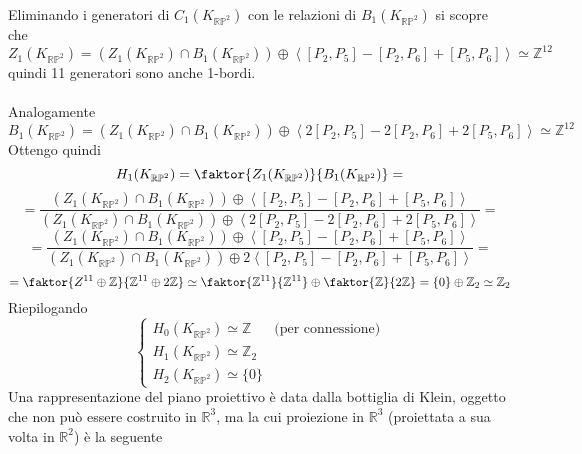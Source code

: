 \documentclass[a4paper]{report}
\newcommand{\Z}{\ensuremath{\mathbb{Z}}}
\newcommand{\R}{\ensuremath{\mathbb{R}}}
\newcommand{\KRP}[1]{\ensuremath{K_{\mathbb{RP}^{#1}}}}
\newcommand{\gen}[1]{\ensuremath{\left<{#1}\right>}}
\begin{document}
\begin{center}

\end{center}
Eliminando i generatori di $C_1(\KRP{2})$ con le relazioni di $B_1(\KRP{2})$ si scopre che
\[
    Z_1(\KRP{2})=\left(Z_1(\KRP{2})\cap B_1(\KRP{2})\right)\oplus\gen{[P_2,P_5]-[P_2,P_6]+[P_5,P_6]}\simeq\Z^{12}
\]
quindi 11 generatori sono anche 1-bordi.\\\\
Analogamente
\[
    B_1(\KRP{2})=\left(Z_1(\KRP{2})\cap B_1(\KRP{2})\right)\oplus\gen{2[P_2,P_5]-2[P_2,P_6]+2[P_5,P_6]}\simeq\Z^{12}
\]
Ottengo quindi
\[
    H_1(\KRP{2})=\faktor{Z_1(\KRP{2})}{B_1(\KRP{2})}=
\]
\[
    =\frac{\left(Z_1(\KRP{2})\cap B_1(\KRP{2})\right)\oplus\gen{[P_2,P_5]-[P_2,P_6]+[P_5,P_6]}}{\left(Z_1(\KRP{2})\cap B_1(\KRP{2})\right)\oplus\gen{2[P_2,P_5]-2[P_2,P_6]+2[P_5,P_6]}}=
\]
\[
    =\frac{\left(Z_1(\KRP{2})\cap B_1(\KRP{2})\right)\oplus\gen{[P_2,P_5]-[P_2,P_6]+[P_5,P_6]}}{\left(Z_1(\KRP{2})\cap B_1(\KRP{2})\right)\oplus 2\gen{[P_2,P_5]-[P_2,P_6]+[P_5,P_6]}}=
\]
\[
    =\faktor{Z^{11}\oplus\Z}{\Z^{11}\oplus 2\Z}\simeq\faktor{\Z^{11}}{\Z^{11}}\oplus\faktor{\Z}{2\Z}=\{0\}\oplus\Z_2\simeq\Z_2
\]
Riepilogando
\[
    \begin{cases}
        H_0(\KRP{2})\simeq\Z & \text{(per connessione)} \\
        H_1(\KRP{2})\simeq\Z_2                          \\
        H_2(\KRP{2})\simeq\{0\}
    \end{cases}
\]
Una rappresentazione del piano proiettivo è data dalla bottiglia di Klein, oggetto che non può essere costruito in $\R^3$, ma la cui proiezione in $\R^3$ (proiettata a sua volta in $\R^2$) è la seguente
\end{document}
